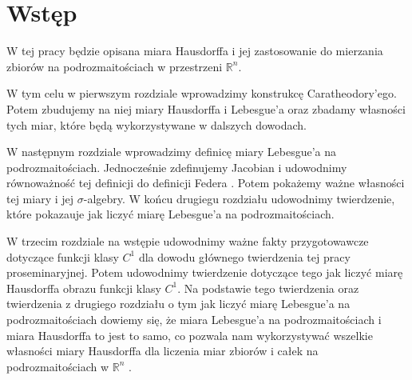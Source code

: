 \chapter*{Wstęp}


W tej pracy będzie opisana miara Hausdorffa i jej zastosowanie do mierzania zbiorów na podrozmaitościach w przestrzeni $\mathbb{R}^n$.

W tym celu w pierwszym rozdziale wprowadzimy konstrukcę Caratheodory'ego. Potem zbudujemy na niej miary Hausdorffa i Lebesgue'a oraz zbadamy własności tych miar, które będą wykorzystywane w dalszych dowodach.

W następnym rozdziale wprowadzimy definicę miary Lebesgue'a na podrozmaitościach. Jednocześnie zdefinujemy Jacobian i udowodnimy równoważność tej definicji do definicji Federa \citep{Federer}. Potem pokażemy ważne własności tej miary i jej $\sigma$-algebry. W końcu drugiegu rozdziału udowodnimy twierdzenie, które pokazauje jak liczyć miarę Lebesgue'a na podrozmaitościach.

W trzecim rozdziale na wstępie udowodnimy ważne fakty przygotowawcze dotyczące funkcji klasy $C^1$ 
dla dowodu głównego twierdzenia tej pracy proseminaryjnej. Potem udowodnimy twierdzenie dotyczące 
tego jak liczyć miarę Hausdorffa obrazu funkcji klasy $C^1$. Na podstawie tego twierdzenia oraz 
twierdzenia z drugiego rozdziału o tym jak liczyć miarę Lebesgue'a na podrozmaitościach dowiemy się, 
że miara Lebesgue'a na podrozmaitościach i miara Hausdorffa to jest to samo, co pozwala nam wykorzystywać 
wszelkie własności miary Hausdorffa dla liczenia miar zbiorów i całek na podrozmaitościach w $\mathbb{R}^n$ .
